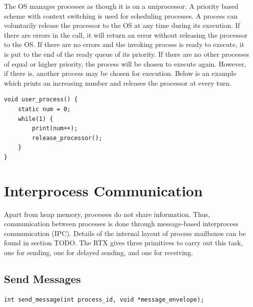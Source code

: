 \documentclass[12pt]{report}
\begin{document}
\par The OS manages processes as though it is on a uniprocessor. A priority based scheme with context switching is used for scheduling processes. A process can voluntarily release the processor to the OS at any time during its execution. If there are errors in the call, it will return an error without releasing the processor to the OS. If there are no errors and the invoking process is ready to execute, it is put to the end of the ready queue of its priority. If there are no other processes of equal or higher priority, the process will be chosen to execute again. However, if there is, another process may be chosen for execution. Below is an example which prints an increasing number and releases the processor at every turn.

\begin{lstlisting}
void user_process() {
    static num = 0;
    while(1) {
        print(num++);
        release_processor();
    }
}
\end{lstlisting}

\section{Interprocess Communication}
\par Apart from heap memory, processes do not share information. Thus, communication between processes is done through message-based interprocess communication (IPC). Details of the internal layout of process mailboxes can be found in section TODO. The RTX gives three primitives to carry out this task, one for sending, one for delayed sending, and one for receiving.

\subsection{Send Messages}
\label{sec:send_message}
\begin{lstlisting}
int send_message(int process_id, void *message_envelope);
\end{lstlisting}
\end{document}
